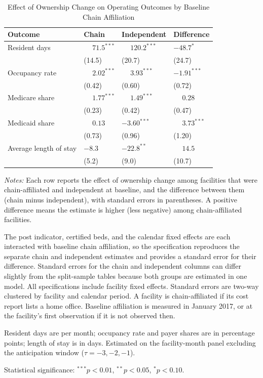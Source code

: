 \documentclass[11pt]{article}
\begin{document}
\clearpage
\begin{table}[!ht]
\centering
\begin{threeparttable}
\caption{Effect of Ownership Change on Operating Outcomes by Baseline Chain Affiliation}
\label{tab:chain-interaction-operating}
\small
\setlength{\tabcolsep}{6pt}

\begin{tabularx}{\textwidth}{@{} l Y Y Y @{}}
\toprule
Outcome & Chain & Independent & Difference \\
\midrule
Resident days & $\phantom{-}71.5^{***}$ & $\phantom{-}120.2^{***}$ & $-48.7^{*}$ \\
 & (14.5) & (20.7) & (24.7) \\[3pt]
Occupancy rate & $\phantom{-}2.02^{***}$ & $\phantom{-}3.93^{***}$ & $-1.91^{***}$ \\
 & (0.42) & (0.60) & (0.72) \\[3pt]
Medicare share & $\phantom{-}1.77^{***}$ & $\phantom{-}1.49^{***}$ & $\phantom{-}0.28$ \\
 & (0.23) & (0.42) & (0.47) \\[3pt]
Medicaid share & $\phantom{-}0.13$ & $-3.60^{***}$ & $\phantom{-}3.73^{***}$ \\
 & (0.73) & (0.96) & (1.20) \\[3pt]
Average length of stay & $-8.3$ & $-22.8^{**}$ & $\phantom{-}14.5$ \\
 & (5.2) & (9.0) & (10.7) \\[3pt]
\bottomrule
\end{tabularx}

\begin{tablenotes}[flushleft]
\footnotesize
\item \textit{Notes:} Each row reports the effect of ownership change among facilities that were chain-affiliated and independent at baseline, and the difference between them (chain minus independent), with standard errors in parentheses. A positive difference means the estimate is higher (less negative) among chain-affiliated facilities.
\item The post indicator, certified beds, and the calendar fixed effects are each interacted with baseline chain affiliation, so the specification reproduces the separate chain and independent estimates and provides a standard error for their difference. Standard errors for the chain and independent columns can differ slightly from the split-sample tables because both groups are estimated in one model. All specifications include facility fixed effects. Standard errors are two-way clustered by facility and calendar period. A facility is chain-affiliated if its cost report lists a home office. Baseline affiliation is measured in January 2017, or at the facility's first observation if it is not observed then.
\item Resident days are per month; occupancy rate and payer shares are in percentage points; length of stay is in days. Estimated on the facility-month panel excluding the anticipation window ($\tau = -3, -2, -1$).
\item Statistical significance: $^{***}p<0.01$, $^{**}p<0.05$, $^{*}p<0.10$.
\end{tablenotes}


\end{threeparttable}
\end{table}
\end{document}
